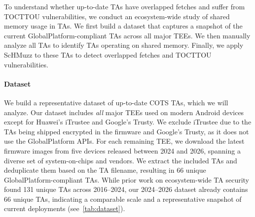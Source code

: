\documentclass[conference]{IEEEtran}
\newcommand{\sysname}{ScHMuzz\xspace}
\newcommand{\numTAs}{66\xspace}
\begin{document}
%                                                                                      

To understand whether up-to-date TAs have overlapped fetches and suffer from TOCTTOU 
vulnerabilities, we conduct an ecosystem-wide study of shared memory usage in TAs.
We first build a dataset that captures a snapshot of the current 
GlobalPlatform-compliant TAs across all major TEEs. We then manually analyze all 
TAs to identify TAs operating on shared memory. 
Finally, we apply \sysname to these TAs to detect overlapped fetches and 
TOCTTOU vulnerabilities.

\paragraph{Dataset}
We build a representative dataset of up-to-date COTS TAs, which we will analyze. 
Our dataset includes \emph{all} major TEEs used on modern Android devices except for 
Huawei's iTrustee and Google's Trusty. We exclude iTrustee due to the TAs being shipped 
encrypted in the firmware and Google's Trusty, as it does not use the GlobalPlatform APIs. 
For each remaining TEE, we download the latest firmware 
images from five devices released between 2024 and 2026, spanning a diverse set of 
system-on-chips and vendors. We extract the included TAs and deduplicate them based on 
the TA filename, resulting in \numTAs unique GlobalPlatform-compliant TAs. 
While prior work on ecosystem-wide TA security~\cite{globalconfusion} found 131 unique TAs across 2016–2024, our 2024–2026 dataset 
already contains \numTAs{} unique TAs, indicating a comparable scale and a representative snapshot of 
current deployments (see~\autoref{tab:dataset}).
\end{document}

